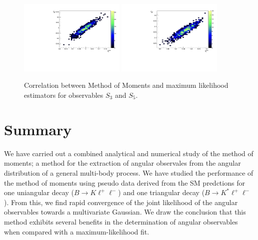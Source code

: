 \documentclass[aps,prd,reprint,nofootinbib,preprintnumbers]{revtex4}
\begin{document}
\begin{figure}[t]
        \centering
            \includegraphics[width=0.45\textwidth]{figs/S3_scat.pdf}
            \includegraphics[width=0.45\textwidth]{figs/S5_scat.pdf}
        \caption{Correlation between Method of Moments and maximum likelihood estimators for observables $S_3$ and $S_5$. }
        \label{fig:correlation}
\end{figure}






\section{Summary}

We have carried out a combined analytical and numerical study of the method of moments; a method for
the extraction of angular observales from the angular distribution of a general multi-body process.
We have studied the performance of the method of moments using pseudo data derived from the SM
predctions for one uniangular decay ($B\to K\ell^+\ell^-$) and one triangular decay ($B\to K^*\ell^+\ell^-$).
From this, we find rapid convergence of the joint likelihood of the angular observables towards a multivariate Gaussian.
We draw the conclusion that this method exhibits several benefits in the determination of angular observables when
compared with a maximum-likelihood fit.\\
\end{document}
